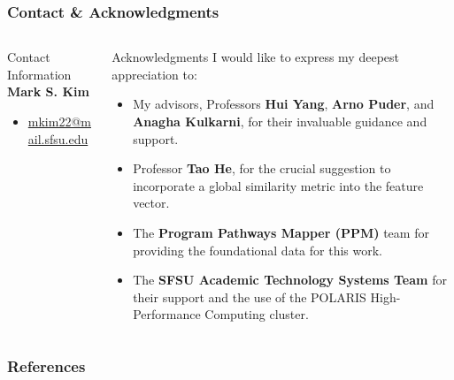 \documentclass[aspectratio=169,10pt]{beamer}
\begin{document}
\begin{frame}
    \frametitle{Contact \& Acknowledgments}
    \fontsize{9}{9}\selectfont
    
    \begin{columns}[T]
        \begin{column}{0.4\textwidth}
            \begin{block}{Contact Information}
                \textbf{Mark S. Kim}
                \begin{itemize}
                    \item \href{mailto:mkim22@mail.sfsu.edu}{mkim22@mail.sfsu.edu}
                \end{itemize}
            \end{block}
        \end{column}
        
        \begin{column}{0.55\textwidth}
            \begin{block}{Acknowledgments}
                I would like to express my deepest appreciation to:
                \begin{itemize}
                    \item My advisors, Professors \textbf{Hui Yang}, \textbf{Arno Puder}, and \textbf{Anagha Kulkarni}, for their invaluable guidance and support.
                    \item Professor \textbf{Tao He}, for the crucial suggestion to incorporate a global similarity metric into the feature vector.
                    \item The \textbf{Program Pathways Mapper (PPM)} team for providing the foundational data for this work.
                    \item The \textbf{SFSU Academic Technology Systems Team} for their support and the use of the POLARIS High-Performance Computing cluster.
                \end{itemize}
            \end{block}
        \end{column}
    \end{columns}
\end{frame}

\begin{frame}[allowframebreaks]
    \frametitle{References}
    \printbibliography
\end{frame}
\end{document}
